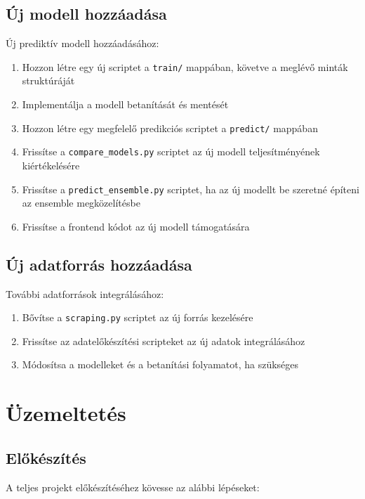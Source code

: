 \subsection{Új modell hozzáadása}

Új prediktív modell hozzáadásához:

\begin{enumerate}
    \item Hozzon létre egy új scriptet a \texttt{train/} mappában, követve a meglévő minták struktúráját
    \item Implementálja a modell betanítását és mentését
    \item Hozzon létre egy megfelelő predikciós scriptet a \texttt{predict/} mappában
    \item Frissítse a \texttt{compare\_models.py} scriptet az új modell teljesítményének kiértékelésére
    \item Frissítse a \texttt{predict\_ensemble.py} scriptet, ha az új modellt be szeretné építeni az ensemble megközelítésbe
    \item Frissítse a frontend kódot az új modell támogatására
\end{enumerate}

\subsection{Új adatforrás hozzáadása}

További adatforrások integrálásához:

\begin{enumerate}
    \item Bővítse a \texttt{scraping.py} scriptet az új forrás kezelésére
    \item Frissítse az adatelőkészítési scripteket az új adatok integrálásához
    \item Módosítsa a modelleket és a betanítási folyamatot, ha szükséges
\end{enumerate}

\section{Üzemeltetés}

\subsection{Előkészítés}

A teljes projekt előkészítéséhez kövesse az alábbi lépéseket:

